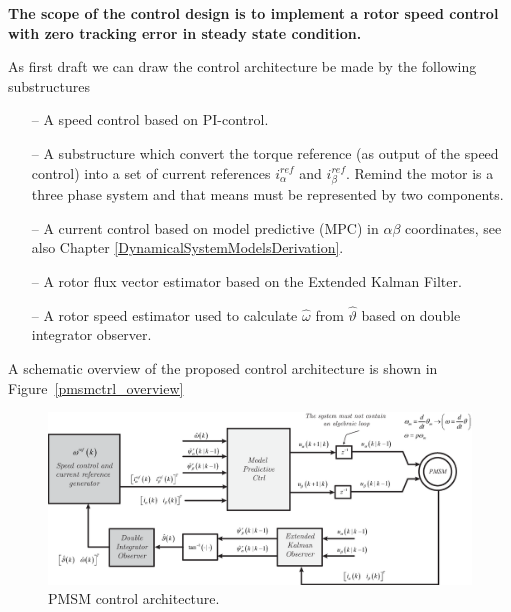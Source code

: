 \documentclass[11pt,a4paper,oneside]{book}
\numberwithin{equation}{section}
\theoremstyle{it}
\theoremstyle{definition}
\begin{document}
\textbf{The scope of the control design is to implement a rotor speed control with zero tracking error in steady state condition.}

\vspace{5mm}
As first draft we can draw the control architecture be made by the following substructures
\begin{itemize}
	\item[--] A speed control based on PI-control.
	\item[--] A substructure which convert the torque reference (as output of the speed control) into a set of current references $i_\alpha^{ref}$ and $i_\beta^{ref}$. Remind the motor is a three phase system and that means must be represented by two components. 	
	\item[--] A current control based on model predictive (MPC) in $\alpha\beta$ coordinates, see also Chapter \ref{DynamicalSystemModelsDerivation}.
	\item[--] A rotor flux vector estimator based on the Extended Kalman Filter.
	\item[--] A rotor speed estimator used to calculate $\hat{\omega}$ from $\hat{\vartheta}$ based on double integrator observer.
\end{itemize}
A schematic overview of the proposed control architecture is shown in 
Figure~\eqref{pmsmctrl_overview}
\begin{figure}[H]
	\centering
	\includegraphics[width = 500pt, angle=0, 
	keepaspectratio]{figures/mpc/pmsm_ctrl_ab_2.eps}
	\captionsetup{width=.5\textwidth}
	\caption{PMSM control architecture.}
	\label{pmsmctrl_overview}
\end{figure}
\end{document}
